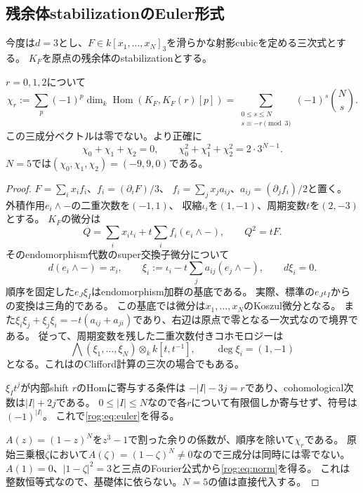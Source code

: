 \subsection{残余体stabilizationのEuler形式}

今度は$d=3$とし、$F\in k[x_1,\ldots,x_N]_3$を滑らかな射影cubicを定める三次式とする。
$K_F$を原点の残余体のstabilizationとする。
\begin{proposition}[非零のEulerベクトル]\label{rog:prop:euler}
$r=0,1,2$について
\[
 \chi_r:=\sum_p(-1)^p\dim_k\operatorname{Hom}(K_F,K_F(r)[p])
 =\sum_{\substack{0\le s\le N\\s\equiv-r\pmod3}}(-1)^s\binom Ns.
 \tag{RO3}\label{rog:eq:euler}
\]
この三成分ベクトルは零でない。より正確に
\[
 \chi_0+\chi_1+\chi_2=0,\qquad
 \chi_0^2+\chi_1^2+\chi_2^2=2\cdot3^{N-1}.
 \tag{RO4}\label{rog:eq:norm}
\]
$N=5$では$(\chi_0,\chi_1,\chi_2)=(-9,9,0)$である。
\end{proposition}
\begin{proof}
$F=\sum_i x_if_i$、$f_i=(\partial_iF)/3$、
$f_i=\sum_jx_ja_{ij}$、$a_{ij}=(\partial_jf_i)/2$と置く。
外積作用$e_i\wedge-$の二重次数を$(-1,1)$、
収縮$\iota_i$を$(1,-1)$、周期変数$t$を$(2,-3)$とする。
$K_F$の微分は
\[
 Q=\sum_i x_i\iota_i+t\sum_i f_i(e_i\wedge-),\qquad Q^2=tF.
\]
そのendomorphism代数のsuper交換子微分について
\[
 d(e_i\wedge-)=x_i,\qquad
 \xi_i:=\iota_i-t\sum_j a_{ij}(e_j\wedge-),\qquad d\xi_i=0.
\]
順序を固定した$e_J\xi_I$はendomorphism加群の基底である。
実際、標準の$e_J\iota_I$からの変換は三角的である。
この基底では微分は$x_1,\ldots,x_N$のKoszul微分となる。
また$\xi_i\xi_j+\xi_j\xi_i=-t(a_{ij}+a_{ji})$であり、右辺は原点で零となる一次式なので境界である。
従って、周期変数を残した二重次数付きコホモロジーは
\[
 \bigwedge(\xi_1,\ldots,\xi_N)\otimes_k k[t,t^{-1}],
 \qquad\deg\xi_i=(1,-1)
 \tag{RO5}\label{rog:eq:exterior}
\]
となる。これは\cite[\S5.6]{ROGDyckerhoff}のClifford計算の三次の場合でもある。

$\xi_I t^j$が内部shift $r$のHomに寄与する条件は
$-|I|-3j=r$であり、cohomological次数は$|I|+2j$である。
$0\le|I|\le N$なので各$r$について有限個しか寄与せず、符号は$(-1)^{|I|}$。
これで\eqref{rog:eq:euler}を得る。

$A(z)=(1-z)^N$を$z^3-1$で割った余りの係数が、順序を除いて$\chi_r$である。
原始三乗根$\zeta$において$A(\zeta)=(1-\zeta)^N\ne0$なので三成分は同時には零でない。
$A(1)=0$、$|1-\zeta|^2=3$と三点のFourier公式から\eqref{rog:eq:norm}を得る。
これは整数恒等式なので、基礎体に依らない。$N=5$の値は直接代入する。
\end{proof}

